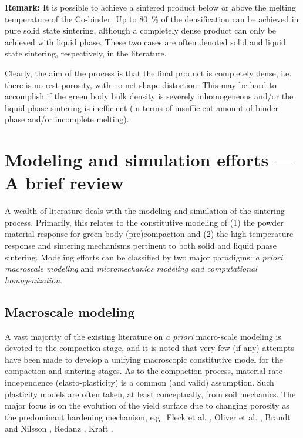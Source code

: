\documentclass[ExampleMasters.tex]{subfiles}
\begin{document}
\textbf{Remark:} It is possible to achieve a sintered product below or above the melting temperature of the Co-binder.
Up to \SI{80}{\percent} of the densification can be achieved in pure solid state sintering, although a completely dense product can only be achieved with liquid phase.
These two cases are often denoted solid and liquid state sintering, respectively, in the literature.


Clearly, the aim of the process is that the final product is completely dense, i.e. there is no rest-porosity, with no net-shape distortion.
This may be hard to accomplish if the green body bulk density is severely inhomogeneous and/or the liquid phase sintering is inefficient (in terms of insufficient amount of binder phase and/or incomplete melting).

\section{Modeling and simulation efforts --- A brief review}

A wealth of literature deals with the modeling and simulation of the sintering process.
Primarily, this relates to the constitutive modeling of
(1) the powder material response for green body (pre)compaction and 
(2) the high temperature response and sintering mechanisms pertinent to both solid and liquid phase sintering.
Modeling efforts can be classified by two major paradigms: \emph{a priori macroscale modeling} and \emph{micromechanics modeling and computational homogenization}.

\subsection{Macroscale modeling}

A vast majority of the existing literature on \emph{a priori} macro-scale modeling is devoted to the compaction stage, and it is noted that very few (if any) attempts have been made to develop a unifying macroscopic constitutive model for the compaction and sintering stages.
As to the compaction process, material rate-independence (elasto-plasticity) is a common (and valid) assumption.
Such plasticity models are often taken, at least conceptually, from soil mechanics.
The major focus is on the evolution of the yield surface due to changing porosity as the predominant hardening mechanism, e.g.\ Fleck et al. \cite{FleKuhMcM1992},
Oliver et al. \cite{OliOllCan1996}, Brandt and Nilsson \cite{BraNil1998}, Redanz \cite{Red1998}, Kraft \cite{Kra2003}.
\end{document}
